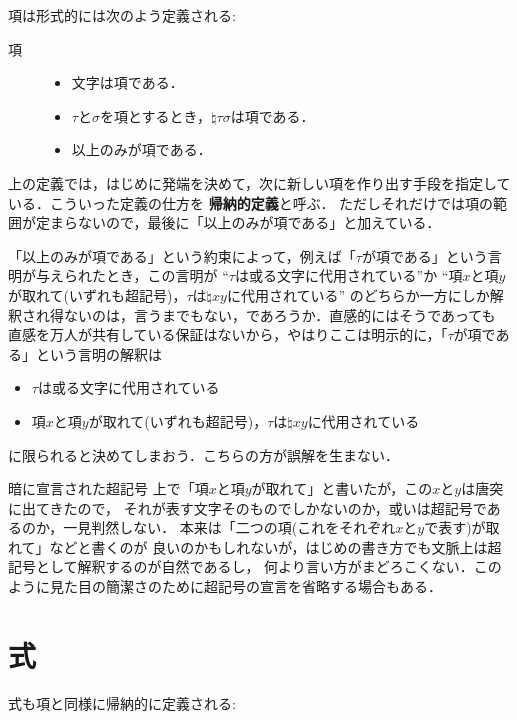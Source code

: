 \documentclass[a4j,10.5pt,oneside,openany]{jsbook}
\theoremstyle{mystyle}
\begin{document}
	項は形式的には次のよう定義される:
	
	\begin{description}
		\item[項]
			\begin{itemize}
				\item 文字は項である．
				\item $\tau$と$\sigma$を項とするとき，$\natural \tau \sigma$は項である．
				\item 以上のみが項である．
			\end{itemize}
	\end{description}
	
	上の定義では，はじめに発端を決めて，次に新しい項を作り出す手段を指定している．こういった定義の仕方を
	{\bf 帰納的定義}と呼ぶ．
	ただしそれだけでは項の範囲が定まらないので，最後に「以上のみが項である」と加えている．
	
	「以上のみが項である」という約束によって，例えば「$\tau$が項である」という言明が与えられたとき，この言明が
	``$\tau$は或る文字に代用されている''か
	``項$x$と項$y$が取れて(いずれも超記号)，$\tau$は$\natural xy$に代用されている''
	のどちらか一方にしか解釈され得ないのは，言うまでもない，であろうか．直感的にはそうであっても
	直感を万人が共有している保証はないから，やはりここは明示的に，「$\tau$が項である」という言明の解釈は
	\begin{itemize}
		\item $\tau$は或る文字に代用されている
		\item 項$x$と項$y$が取れて(いずれも超記号)，$\tau$は$\natural xy$に代用されている
	\end{itemize}
	に限られると決めてしまおう．こちらの方が誤解を生まない．
	
	\begin{itembox}[l]{暗に宣言された超記号}
		上で「項$x$と項$y$が取れて」と書いたが，この$x$と$y$は唐突に出てきたので，
		それが表す文字そのものでしかないのか，或いは超記号であるのか，一見判然しない．
		本来は「二つの項(これをそれぞれ$x$と$y$で表す)が取れて」などと書くのが
		良いのかもしれないが，はじめの書き方でも文脈上は超記号として解釈するのが自然であるし，
		何より言い方がまどろこくない．このように見た目の簡潔さのために超記号の宣言を省略する場合もある．
	\end{itembox}
	
\section{式}
	式も項と同様に帰納的に定義される:
	
\end{document}
